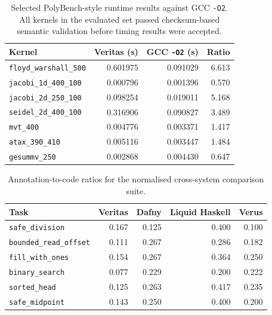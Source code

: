 \begin{table}[h]
  \centering
  \small
  \begin{tabular}{l r r r}
    \hline
    \textbf{Kernel}              & \textbf{Veritas (s)} & \textbf{GCC \texttt{-O2} (s)} & \textbf{Ratio} \\
    \hline
    \texttt{floyd\_warshall\_500} & 0.601975           & 0.091029                      & 6.613          \\
    \texttt{jacobi\_1d\_400\_100} & 0.000796          & 0.001396                      & 0.570          \\
    \texttt{jacobi\_2d\_250\_100} & 0.098254          & 0.019011                      & 5.168          \\
    \texttt{seidel\_2d\_400\_100} & 0.316906          & 0.090827                      & 3.489          \\
    \texttt{mvt\_400}            & 0.004776            & 0.003371                      & 1.417          \\
    \texttt{atax\_390\_410}      & 0.005116            & 0.003447                      & 1.484          \\
    \texttt{gesummv\_250}        & 0.002868            & 0.004430                      & 0.647          \\
    \hline
  \end{tabular}
  \caption{Selected PolyBench-style runtime results against GCC
    \texttt{-O2}. All kernels in the evaluated set passed checksum-based
    semantic validation before timing results were accepted.}
  \label{tab:polybench-practicality}
\end{table}

\begin{table}[h]
  \centering
  \small
  \begin{tabular}{l r r r r}
    \hline
    \textbf{Task}                  & \textbf{Veritas} & \textbf{Dafny} & \textbf{Liquid Haskell} & \textbf{Verus} \\
    \hline
    \texttt{safe\_division}        & 0.167            & 0.125          & 0.400                   & 0.100          \\
    \texttt{bounded\_read\_offset} & 0.111            & 0.267          & 0.286                   & 0.182          \\
    \texttt{fill\_with\_ones}      & 0.154            & 0.267          & 0.364                   & 0.250          \\
    \texttt{binary\_search}        & 0.077            & 0.229          & 0.200                   & 0.222          \\
    \texttt{sorted\_head}          & 0.125            & 0.263          & 0.417                   & 0.235          \\
    \texttt{safe\_midpoint}        & 0.143            & 0.250          & 0.400                   & 0.200          \\
    \hline
  \end{tabular}
  \caption{Annotation-to-code ratios for the normalised cross-system comparison suite.}
  \label{tab:cross-system-annotation-burden}
\end{table}

